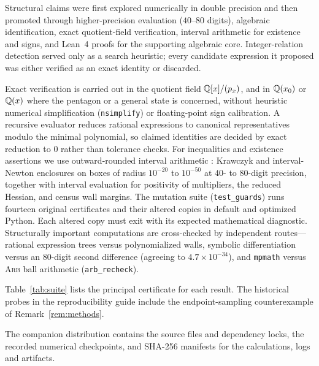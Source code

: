 Structural claims were first explored numerically in double precision and then promoted through higher-precision evaluation ($40$--$80$ digits), algebraic identification, exact quotient-field verification, interval arithmetic for existence and signs, and Lean~4 proofs for the supporting algebraic core. Integer-relation detection \cite{fba1999} served only as a search heuristic; every candidate expression it proposed was either verified as an exact identity or discarded.

Exact verification is carried out in the quotient field $\mathbb{Q}[x]/(p_x)$, and in $\mathbb{Q}(x_0)$ or $\mathbb{Q}(x)$ where the pentagon or a general state is concerned, without heuristic numerical simplification (\texttt{nsimplify}) or floating-point sign calibration. A recursive evaluator reduces rational expressions to canonical representatives modulo the minimal polynomial, so claimed identities are decided by exact reduction to $0$ rather than tolerance checks. For inequalities and existence assertions we use outward-rounded interval arithmetic \cite{neumaier1990}: Krawczyk and interval-Newton enclosures on boxes of radius $10^{-20}$ to $10^{-50}$ at $40$- to $80$-digit precision, together with interval evaluation for positivity of multipliers, the reduced Hessian, and census wall margins. The mutation suite (\texttt{test\_guards}) runs fourteen original certificates and their altered copies in default and optimized Python. Each altered copy must exit with its expected mathematical diagnostic. Structurally important computations are cross-checked by independent routes---rational expression trees versus polynomialized walls, symbolic differentiation versus an $80$-digit second difference (agreeing to $4.7\times10^{-34}$), and \texttt{mpmath} versus \textsc{Arb} ball arithmetic (\texttt{arb\_recheck}).

Table~\ref{tab:suite} lists the principal certificate for each result. The historical probes in the reproducibility guide include the endpoint-sampling counterexample of Remark~\ref{rem:methods}.

The companion distribution \cite{anc} contains the source files and dependency locks, the recorded numerical checkpoints, and SHA-256 manifests for the calculations, logs and artifacts.

